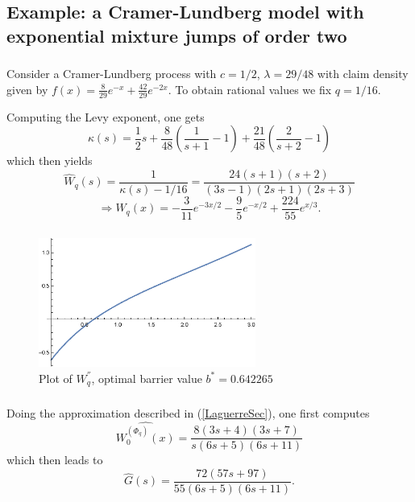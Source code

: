 \documentclass[xcolor=pdftex,dvipsnames,table]{beamer}
\theoremstyle{definition}
\def\lt{\left}
\def\rt{\right}
\begin{document}
\subsection{Example: a Cramer-Lundberg model with exponential mixture jumps of order two}
\label{exCL2}

\begin{frame}
\frametitle{\insertsectionhead}
\framesubtitle{\insertsubsectionhead}
Consider a Cramer-Lundberg process with $c=1/2$, $\lambda = 29/48$ with claim density given by $f(x) = \frac{8}{29}e^{-x} + \frac{42}{29} e^{-2x}$. To obtain rational values we fix $q=1/16$.

Computing the Levy exponent, one gets
\[
\kappa(s) = \frac{1}{2} s + \frac{8}{48} \lt( \frac{1}{s+1} - 1\rt) + \frac{21}{48} \lt( \frac{2}{s+2} -1 \rt)
\]
which then yields
\[
\hat{W}_q (s) = \frac{1}{\kappa(s) - 1/16} = \frac{24(s+1)(s+2)}{(3s-1)(2s+1)(2s+3)}
\]
\[
\Rightarrow W_q(x) = -\frac{3}{11} e^{-3x/2} - \frac{9}{5} e^{-x/2} +\frac{224}{55} e^{x/3}.
\]
\end{frame}

\begin{frame}
\frametitle{\insertsectionhead}
\framesubtitle{\insertsubsectionhead}
\begin{figure}
\caption{Plot of $W_q^{''}$, optimal barrier value $b^* = 0.642265$}
\begin{center}
\includegraphics [width=2.8in]{pw2.eps}
\end{center}
\label{pw2}
\end{figure}
\end{frame}

\begin{frame}
\frametitle{\insertsectionhead}
\framesubtitle{\insertsubsectionhead}
Doing the approximation described in (\ref{LaguerreSec}), one first computes
\[
\widehat{W^{(\Phi_q)}_0 (x)} = \frac{8(3s+4)(3s+7)}{s(6s+5)(6s+11)}
\]
which then leads to
\[
\hat{G}(s) = \frac{72(57s+97)}{55(6s+5)(6s+11)}.
\]
\end{frame}
\end{document}
